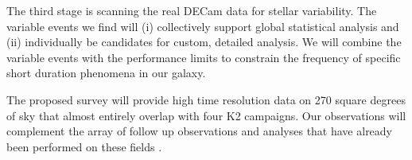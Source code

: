 \documentclass[11pt]{article}
\begin{document}
The third stage is scanning the real DECam data for stellar variability. The variable events we find will (i) collectively support global statistical analysis and (ii) individually be candidates for custom, detailed analysis. We will combine the variable events with the performance limits to constrain the frequency of specific short duration phenomena in our galaxy.

% 



% 
% 
%

\otherfacilities

The proposed survey will provide high time resolution data on 270 square degrees of sky that almost entirely overlap with four K2 campaigns. Our observations will complement the array of follow up observations and analyses that have already been performed on these fields \citep{2015MNRAS.447.3536N,2015ApJ...809L...3S,2015AJ....150..126S,2016ApJS..224....2H,2016A&A...594A.100B,2017PASP..129j4501Z}. 
\end{document}
